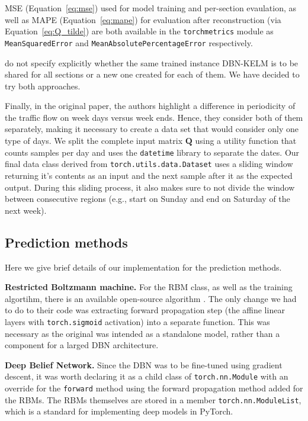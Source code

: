 MSE (Equation~\ref{eq:mse}) used for model training and per-section evaulation,
as well as MAPE (Equation~\ref{eq:mape}) for evaluation after reconstruction
(via Equation~\ref{eq:Q_tilde}) are both available in the \texttt{torchmetrics}
module as \texttt{MeanSquaredError} and \texttt{MeanAbsolutePercentageError}
respectively.

\citet{Han.2020} do not specify explicitly whether the same trained instance
DBN-KELM is to be shared for all sections or a new one created for each of them.
We have decided to try both approaches.

Finally, in the original paper, the authors highlight a difference in
periodicity of the traffic flow on week days versus week ends. Hence, they
consider both of them separately, making it necessary to create a data set that
would consider only one type of days. We split the complete input matrix
$\mathbf{Q}$ using a utility function that counts samples per day and uses the
\texttt{datetime} library to separate the dates. Our final data class derived
from \texttt{torch.utils.data.Dataset} uses a sliding window returning it's
contents as an input and the next sample after it as the expected output. During
this sliding process, it also makes sure to not divide the window between
consecutive regions (e.g., start on Sunday and end on Saturday of the next
week).

\subsection{Prediction methods}

Here we give brief details of our implementation for the prediction methods.

\textbf{Restricted Boltzmann machine.} For the RBM class, as well as the
training algortihm, there is an available open-source algorithm
\cite{Nguyen.2019}. The only change we had to do to their code was extracting
forward propagation step (the affine linear layers with \texttt{torch.sigmoid}
activation) into a separate function. This was necessary as the original was
intended as a standalone model, rather than a component for a larged DBN
architecture.

\textbf{Deep Belief Network.} Since the DBN was to be fine-tuned using gradient
descent, it was worth declaring it as a child class of \texttt{torch.nn.Module}
with an override for the \texttt{forward} method using the forward propagation
method added for the RBMs. The RBMs themselves are stored in a member
\texttt{torch.nn.ModuleList}, which is a standard for implementing deep models
in PyTorch.

